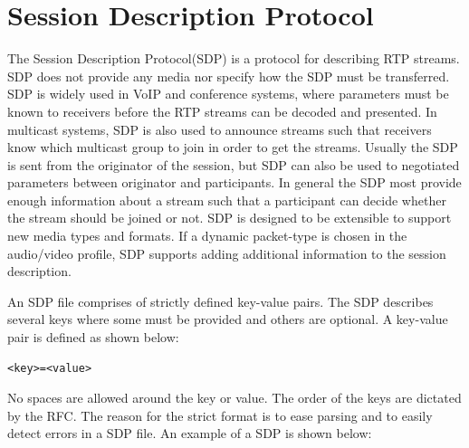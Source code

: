 \section{Session Description Protocol}
The Session Description Protocol(SDP) is a protocol for describing RTP streams.
SDP does not provide any media nor specify how the SDP must be transferred.
SDP is widely used in VoIP and conference systems, where parameters must be known to receivers before the RTP streams can be decoded and presented. In multicast systems, SDP is also used to announce streams such that receivers know which multicast group to join in order to get the streams. Usually the SDP is sent from the originator of the session, but SDP can also be used to negotiated parameters between originator and participants. In general the SDP most provide enough information about a stream such that a participant can decide whether the stream should be joined or not.  SDP is designed to be extensible to support new media types and formats. If a dynamic packet-type is chosen in the audio/video profile, SDP supports adding additional information to the session description. 

An SDP file comprises of strictly defined key-value pairs. The SDP describes several keys where some must be provided and others are optional. A key-value pair is defined as shown below:
\begin{verbatim}
<key>=<value>
\end{verbatim}

No spaces are allowed around the key or value.
The order of the keys are dictated by the RFC. The reason for the strict format is to ease parsing and to easily detect errors in a SDP file. An example of a SDP is shown below:

